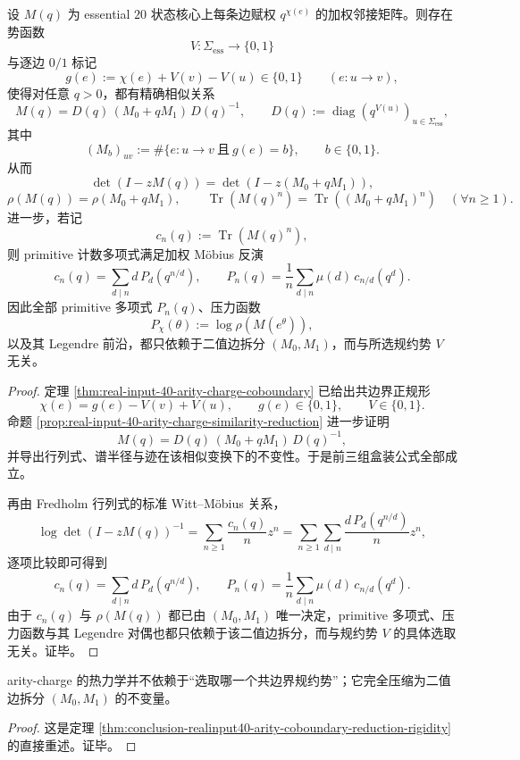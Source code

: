 \begin{theorem}\label{thm:conclusion-realinput40-arity-coboundary-reduction-rigidity}
设 \(M(q)\) 为 essential \(20\) 状态核心上每条边赋权 \(q^{\chi(e)}\) 的加权邻接矩阵。则存在势函数
\[
V:\Sigma_{\mathrm{ess}}\to\{0,1\}
\]
与逐边 \(0/1\) 标记
\[
g(e):=\chi(e)+V(v)-V(u)\in\{0,1\}\qquad (e:u\to v),
\]
使得对任意 \(q>0\)，都有精确相似关系
\[
M(q)=D(q)\,(M_0+qM_1)\,D(q)^{-1},
\qquad
D(q):=\operatorname{diag}(q^{V(u)})_{u\in\Sigma_{\mathrm{ess}}},
\]
其中
\[
(M_b)_{uv}:=\#\{e:u\to v\ \text{且}\ g(e)=b\},
\qquad b\in\{0,1\}.
\]
从而
\[
\det(I-zM(q))=\det(I-z(M_0+qM_1)),
\]
\[
\rho(M(q))=\rho(M_0+qM_1),
\qquad
\operatorname{Tr}(M(q)^n)=\operatorname{Tr}((M_0+qM_1)^n)\quad(\forall n\ge 1).
\]
进一步，若记
\[
c_n(q):=\operatorname{Tr}(M(q)^n),
\]
则 primitive 计数多项式满足加权 Möbius 反演
\[
c_n(q)=\sum_{d\mid n} d\,P_d(q^{n/d}),
\qquad
P_n(q)=\frac{1}{n}\sum_{d\mid n}\mu(d)\,c_{n/d}(q^d).
\]
因此全部 primitive 多项式 \(P_n(q)\)、压力函数
\[
P_\chi(\theta):=\log\rho(M(e^\theta)),
\]
以及其 Legendre 前沿，都只依赖于二值边拆分 \((M_0,M_1)\)，而与所选规约势 \(V\) 无关。
\end{theorem}
\begin{proof}
定理 \ref{thm:real-input-40-arity-charge-coboundary} 已给出共边界正规形
\[
\chi(e)=g(e)-V(v)+V(u),
\qquad
g(e)\in\{0,1\},
\qquad
V\in\{0,1\}.
\]
命题 \ref{prop:real-input-40-arity-charge-similarity-reduction} 进一步证明
\[
M(q)=D(q)\,(M_0+qM_1)\,D(q)^{-1},
\]
并导出行列式、谱半径与迹在该相似变换下的不变性。于是前三组盒装公式全部成立。

再由 Fredholm 行列式的标准 Witt--Möbius 关系，
\[
\log\det(I-zM(q))^{-1}
=
\sum_{n\ge 1}\frac{c_n(q)}{n}z^n
=
\sum_{n\ge 1}\sum_{d\mid n}\frac{d\,P_d(q^{n/d})}{n}z^n,
\]
逐项比较即可得到
\[
c_n(q)=\sum_{d\mid n} d\,P_d(q^{n/d}),
\qquad
P_n(q)=\frac{1}{n}\sum_{d\mid n}\mu(d)\,c_{n/d}(q^d).
\]
由于 \(c_n(q)\) 与 \(\rho(M(q))\) 都已由 \((M_0,M_1)\) 唯一决定，primitive 多项式、压力函数与其 Legendre 对偶也都只依赖于该二值边拆分，而与规约势 \(V\) 的具体选取无关。证毕。
\end{proof}

\begin{corollary}\label{cor:conclusion-realinput40-arity-binary-edge-split-invariant}
arity-charge 的热力学并不依赖于“选取哪一个共边界规约势”；它完全压缩为二值边拆分 \((M_0,M_1)\) 的不变量。
\end{corollary}
\begin{proof}
这是定理 \ref{thm:conclusion-realinput40-arity-coboundary-reduction-rigidity} 的直接重述。证毕。
\end{proof}

